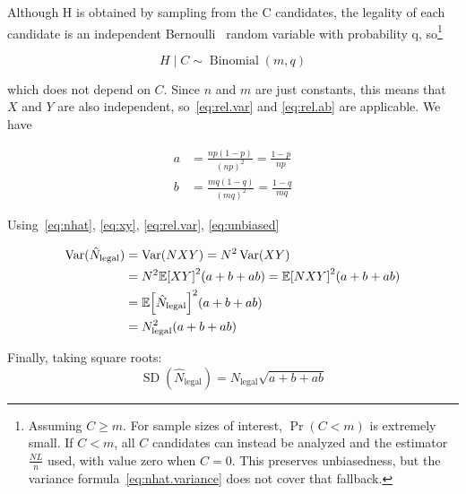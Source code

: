 \documentclass[a4paper,10pt]{article}
\DeclareMathOperator{\SD}{SD}
\DeclareMathOperator{\Var}{Var}
\DeclarePairedDelimiter\bracket{[}{]}
\newcommand{\E}[1]{\mathbb{E}\bracket*{#1}}
\begin{document}
Although H is obtained by sampling from the C candidates, the legality of each
candidate is an independent Bernoulli~\cite{wiki:bernoulli} random variable with
probability q, so\footnote{
  Assuming $C \ge m$. For sample sizes of interest, $\Pr(C < m)$ is extremely
  small. If $C < m$, all $C$ candidates can instead be analyzed and the
  estimator $\frac{NL}{n}$ used, with value zero when $C = 0$. This preserves
  unbiasedness, but the variance formula~\ref{eq:nhat.variance} does not cover
  that fallback.
}

\begin{equation}
  H \mid C \sim \operatorname{Binomial}(m, q)
\end{equation}

which does not depend on $C$. Since $n$ and $m$ are just constants, this means
that $X$ and $Y$ are also independent, so~\ref{eq:rel.var} and \ref{eq:rel.ab}
are applicable. We have

\begin{align}
  a &= \frac{np(1-p)}{(np)^2} = \frac{1-p}{np}  \\
  b &= \frac{mq(1-q)}{(mq)^2} = \frac{1-q}{mq}
\end{align}

Using~\ref{eq:nhat}, \ref{eq:xy}, \ref{eq:rel.var}, \ref{eq:unbiased}

\begin{align}
  \Var(\hat{N}_{\text{legal}}) &= \Var(NXY) = N^2\Var(XY)  \\
    &= N^2 \E{XY}^2 (a + b + ab) = \E{NXY}^2 (a + b + ab)  \\
    &= \E{\hat{N}_{\text{legal}}}^2 (a + b + ab)           \\
    &= N_{\text{legal}}^2 (a + b + ab)
\end{align}

Finally, taking square roots:
\begin{equation}
  \label{eq:nhat.variance}
  \SD(\hat{N}_{\text{legal}}) = N_{\text{legal}} \sqrt{a + b + ab}
\end{equation}
\end{document}

